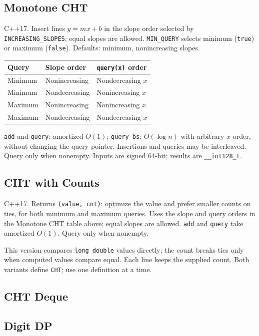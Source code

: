 \subsection{Monotone CHT}
C++17. Insert lines $y=mx+b$ in the slope order selected by
\texttt{INCREASING\_SLOPES}; equal slopes are allowed.
\texttt{MIN\_QUERY} selects minimum (\texttt{true}) or maximum
(\texttt{false}). Defaults: minimum, nonincreasing slopes.

\begin{center}
\begin{tabular}{lll}
\textbf{Query} & \textbf{Slope order} & \textbf{\texttt{query(x)} order} \\
\hline
Minimum & Nonincreasing & Nondecreasing $x$ \\
Minimum & Nondecreasing & Nonincreasing $x$ \\
Maximum & Nonincreasing & Nonincreasing $x$ \\
Maximum & Nondecreasing & Nondecreasing $x$ \\
\end{tabular}
\end{center}
\texttt{add} and \texttt{query}: amortized $O(1)$;
\texttt{query\_bs}: $O(\log n)$ with arbitrary $x$ order,
without changing the query pointer. Insertions and queries may be
interleaved. Query only when nonempty. Inputs are signed 64-bit;
results are \texttt{\_\_int128\_t}.


\subsection{CHT with Counts}
C++17. Returns \texttt{(value, cnt)}: optimize the value and prefer
smaller counts on ties, for both minimum and maximum queries.
Uses the slope and query orders in the Monotone CHT table above;
equal slopes are allowed. \texttt{add} and \texttt{query} take
amortized $O(1)$. Query only when nonempty.

This version compares \texttt{long double} values directly; the
count breaks ties only when computed values compare equal. Each
line keeps the supplied count. Both variants define \texttt{CHT};
use one definition at a time.

\subsection{CHT Deque}

\subsection{Digit DP}

